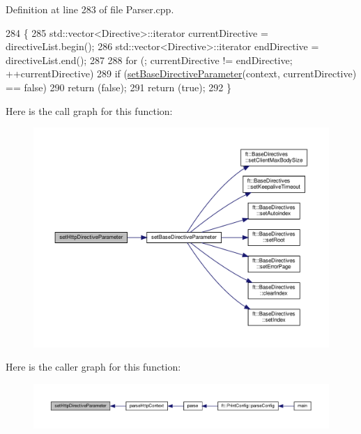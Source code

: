 Definition at line 283 of file Parser.\+cpp.


\begin{DoxyCode}
284     \{
285         std::vector<Directive>::iterator    currentDirective = directiveList.begin();
286         std::vector<Directive>::iterator    endDirective = directiveList.end();
287 
288         \textcolor{keywordflow}{for} (; currentDirective != endDirective; ++currentDirective)
289             \textcolor{keywordflow}{if} (\hyperlink{classft_1_1_parser_a9f412d172694519d0d8dd9edacd257c0}{setBaseDirectiveParameter}(context, currentDirective) == \textcolor{keyword}{false})
290                 \textcolor{keywordflow}{return} (\textcolor{keyword}{false});
291         \textcolor{keywordflow}{return} (\textcolor{keyword}{true});
292     \}
\end{DoxyCode}
Here is the call graph for this function\+:
\nopagebreak
\begin{figure}[H]
\begin{center}
\leavevmode
\includegraphics[width=350pt]{classft_1_1_parser_a5d287909e4c513e20b017ba0699b0cbf_cgraph}
\end{center}
\end{figure}
Here is the caller graph for this function\+:
\nopagebreak
\begin{figure}[H]
\begin{center}
\leavevmode
\includegraphics[width=350pt]{classft_1_1_parser_a5d287909e4c513e20b017ba0699b0cbf_icgraph}
\end{center}
\end{figure}
\mbox{\label{classft_1_1_parser_a82bee2278db1afa69bbb6eb6f192743c}} 
